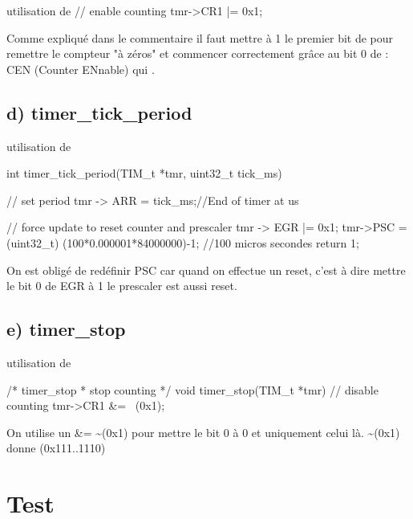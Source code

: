 {\begin{Cpp}{utilisation de }
{	// enable counting
	tmr->CR1 |= 0x1; 	
}
\end{Cpp}

Comme expliqué dans le commentaire il faut mettre à 1 le premier bit de  pour remettre le compteur "à zéros" et commencer correctement grâce au bit 0 de  : CEN (Counter ENnable) qui .\\

\subsection{d) timer\_tick\_period}

\begin{Cpp}{utilisation de } 

int timer_tick_period(TIM_t *tmr, uint32_t tick_ms)
{
    // set period
	tmr -> ARR = tick_ms;//End of timer at us  
    
    // force update to reset counter and prescaler
	tmr -> EGR |= 0x1;
	tmr->PSC = (uint32_t) (100*0.000001*84000000)-1; //100 micros secondes
	return 1;
}

\end{Cpp}

On est obligé de redéfinir PSC car quand on effectue un reset, c'est à dire mettre le bit 0 de EGR à 1 le prescaler est aussi reset.

\newpage
\subsection{e) timer\_stop}

\begin{Cpp}{utilisation de } 

/* timer_stop
 *   stop counting
 */
void timer_stop(TIM_t *tmr)
{
	// disable counting
	tmr->CR1 &= ~(0x1);
}

\end{Cpp}


On utilise un \&= \~{}(0x1) pour mettre le bit 0 à 0 et uniquement celui là.
\~{}(0x1) donne (0x111..1110)\\



\newpage



\section{Test}

}
